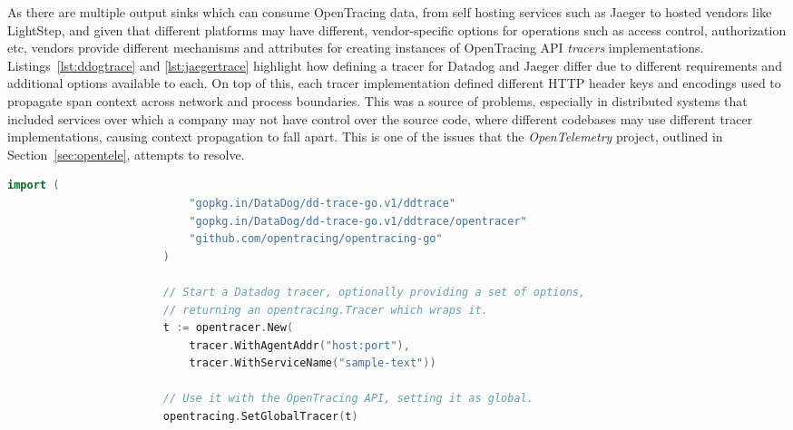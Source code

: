 \documentclass[12pt,pdftex,titlepage]{report}
\begin{document}
                As there are multiple output sinks which can consume OpenTracing data, from self hosting services such as Jaeger to hosted vendors like LightStep, and given that
                different platforms may have different, vendor-specific options for operations such as access control, authorization etc, vendors provide different mechanisms
                and attributes for creating instances of OpenTracing API \textit{tracers} implementations. Listings~{\ref{lst:ddogtrace}} and {\ref{lst:jaegertrace}} highlight how defining a tracer
                for Datadog and Jaeger differ due to different requirements and additional options available to each. On top of this, each tracer implementation defined different HTTP header 
                keys and encodings used to propagate span context across network and process boundaries. This was a source of problems, especially in distributed systems
                that included services over which a company may not have control over the source code, where different codebases may use different tracer implementations, causing context
                propagation to fall apart. This is one of the issues that the \textit{OpenTelemetry} project, outlined in Section~{\ref{sec:opentele}}, attempts to resolve.

                \bigskip
                \begin{spacing}{1.0}
                    \begin{lstlisting}[caption=Example Go language snippet of instatiating a Datadog OpenTracing compatible tracer., language=Go, gobble=24, label={lst:ddogtrace}]
                        import (
                            "gopkg.in/DataDog/dd-trace-go.v1/ddtrace"
                            "gopkg.in/DataDog/dd-trace-go.v1/ddtrace/opentracer"
                            "github.com/opentracing/opentracing-go"
                        )

                        // Start a Datadog tracer, optionally providing a set of options,
                        // returning an opentracing.Tracer which wraps it.
                        t := opentracer.New(
                            tracer.WithAgentAddr("host:port"),
                            tracer.WithServiceName("sample-text"))

                        // Use it with the OpenTracing API, setting it as global.
                        opentracing.SetGlobalTracer(t)
                    \end{lstlisting}
                \end{spacing}
\end{document}
